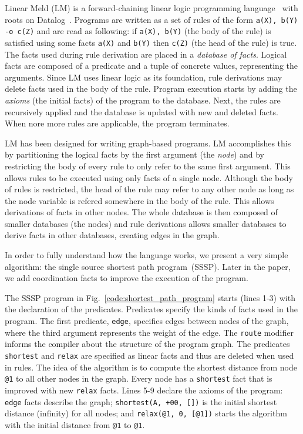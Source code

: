 
Linear Meld (LM) is a forward-chaining linear logic programming
language~\cite{cruz-iclp14} with roots on Datalog~\cite{Ramakrishnan93asurvey}.
Programs are written as a set of rules of the form
\texttt{a(X), b(Y) -o c(Z)} and are read as following: if \texttt{a(X), b(Y)} (the body of
the rule) is satisfied using some facts \texttt{a(X)} and \texttt{b(Y)} then
\texttt{c(Z)} (the head of the rule) is true.
The facts used during rule derivation are placed in a \emph{database of facts}.
Logical facts are composed of a predicate and a tuple of concrete values,
representing the arguments.
Since LM uses linear logic as its foundation, rule derivations
may delete facts used in the body of the rule. Program execution starts by
adding the \emph{axioms} (the initial facts) of the program to the database.
Next, the rules are recursively applied and the database is updated with new and
deleted facts. When nore more rules are applicable, the program terminates.

LM has been designed for writing graph-based programs. LM accomplishes this by
partitioning the logical facts by the first argument (the \emph{node}) and by
restricting the body of every rule to only refer to the same first argument.
This allows rules to be executed using only facts of a single node. Although the
body of rules is restricted, the head of the rule may refer to any other node as
long as the node variable is refered somewhere in the body of the rule. This allows
derivations of facts in other nodes. The whole database is then composed of smaller
databases (the nodes) and rule derivations allows smaller databases to derive
facts in other databases, creating edges in the graph.

In order to fully understand how the language works, we present a very simple
algorithm: the single source shortest path program~(SSSP). Later in the paper, we
add coordination facts to improve the execution of the program.

The SSSP program in Fig.~\ref{code:shortest_path_program} starts (lines 1-3)
with the declaration of the predicates. Predicates specify the kinds of facts
used in the program. The first predicate, \texttt{edge}, specifies edges between
nodes of the graph, where the third argument represents the weight of the edge.
The \texttt{route} modifier informs the compiler about the structure of the
program graph. The predicates \texttt{shortest} and \texttt{relax} are specified
as linear facts and thus are deleted when used in rules.
The idea of the algorithm is to compute the shortest distance from node
\texttt{@1} to all other nodes in the graph. Every node has a \texttt{shortest}
fact that is improved with new \texttt{relax} facts.
Lines 5-9 declare the axioms of the program: \texttt{edge} facts describe the
graph; \texttt{shortest(A, +00, [])} is the initial shortest distance (infinity)
for all nodes; and \texttt{relax(@1, 0, [@1])} starts the algorithm with the
initial distance from \texttt{@1} to \texttt{@1}.

